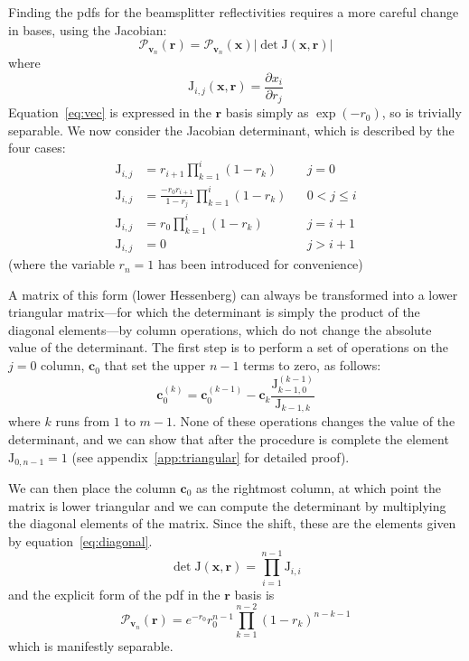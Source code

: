 \documentclass[aps,prl,twocolumn,floatfix]{revtex4}
\renewcommand{\vec}[1]{\mathbf{#1}}
\newcommand{\mat}[1]{\mathrm{#1}}
\newcommand{\of}[1]{\!\left(#1\right)}
\newcommand{\pdf}{{pdf}}
\newcommand{\abs}[1]{\left|#1\right|}
\newcommand{\prob}[1]{\mathcal{#1}}
\begin{document}
Finding the \pdf{}s for the beamsplitter reflectivities requires a more careful
change in bases, using the Jacobian:
\begin{equation}
  \prob{P}_{\vec{v}_n} \of{\vec{r}} = \prob{P}_{\vec{v}_n} \of{\vec{x}}
  \abs{\det \mat{J} \of{\vec{x}, \vec{r}}}
\end{equation}
where
\begin{equation}
  \mat{J}_{i,j} \of{\vec{x}, \vec{r}} = \frac{\partial x_{i}}{\partial r_j}
\end{equation}
Equation~\ref{eq:vec} is expressed in the \(\vec{r}\) basis simply as \(\exp
\of{-r_0}\), so is trivially separable. We now consider the Jacobian
determinant, which is described by the four cases:
\begin{align}
  \label{eq:firstcolumn}
  \mat{J}_{i,j} &= r_{i+1} \prod_{k=1}^{i} \left( 1-r_k \right) && j=0 \\
  \mat{J}_{i,j} &= \frac{-r_0 r_{i+1}}{1-r_{j}} \prod_{k=1}^{i} \left( 1-r_k
    \right) && 0< j \leq i\\
  \label{eq:diagonal}
  \mat{J}_{i,j} &= r_0 \prod_{k=1}^{i} \left( 1-r_k \right) && j = i+1 \\
  \mat{J}_{i,j} &= 0 && j>i+1
\end{align}
(where the variable \(r_{n}=1\) has been introduced for convenience)

A matrix of this form (lower Hessenberg) can always be transformed into a
lower triangular matrix---for which the determinant is simply the product of the
diagonal elements---by column operations, which do not change the absolute value
of the determinant. The first step is to perform a set of operations on the
\(j=0\) column, \(\vec{c}_{0}\) that set the upper \(n-1\) terms to zero, as
follows:
\begin{equation}
  \vec{c}_{0}^{\left( k \right)} = \vec{c}_{0}^{\left( k-1 \right)} -
  \vec{c}_{k} \frac{\mat{J}_{k-1,0}^{\left( k-1 \right)}}{\mat{J}_{k-1,k}}
\end{equation}
where \(k\) runs from \(1\) to \(m-1\). None of these operations changes the
value of the determinant, and we can show that after the procedure is complete
the element \(\mat{J}_{0,n-1}=1\) (see appendix~\ref{app:triangular} for
detailed proof).

We can then place the column \(\vec{c}_{0}\) as the rightmost column, at which
point the matrix is lower triangular and we can compute the determinant by
multiplying the diagonal elements of the matrix. Since the shift, these are the
elements given by equation~\ref{eq:diagonal}.
\begin{equation}
  \det \mat{J} \of{ \vec{x}, \vec{r} } = \prod_{i=1}^{n-1} \mat{J}_{i,i}
\end{equation}
and the explicit form of the \pdf{} in the \(\vec{r}\) basis is
\begin{equation}
  \prob{P}_{\vec{v}_n} \of{ \vec{r} } = e^{-r_0} r_0^{n-1} \prod_{k=1}^{n-2}
  \left( 1-r_k \right)^{n-k-1}
\end{equation}
which is manifestly separable.
\end{document}
